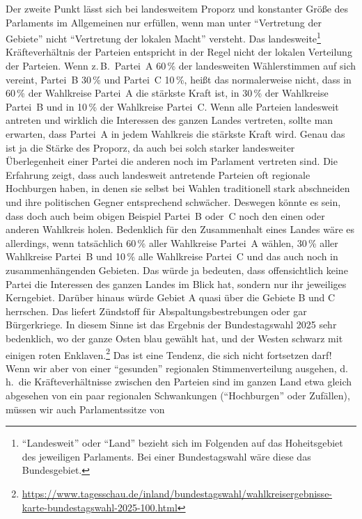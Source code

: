 Der zweite Punkt lässt sich bei landesweitem Proporz und konstanter Größe des Parlaments im
Allgemeinen nur erfüllen, wenn man unter \enquote{Vertretung der Gebiete} nicht
\enquote{Vertretung der lokalen Macht} versteht.
Das landesweite\footnote{\enquote{Landesweit} oder \enquote{Land} bezieht sich im Folgenden auf
das Hoheitsgebiet des jeweiligen Parlaments. Bei einer Bundestagswahl wäre diese das
Bundesgebiet.} Kräfteverhältnis der Parteien entspricht in der Regel nicht der lokalen Verteilung
der Parteien. Wenn z.\,B.\ Partei~A 60\,\% der landesweiten Wählerstimmen auf sich vereint,
Partei~B 30\,\% und Partei~C 10\,\%, heißt das normalerweise nicht, dass in 60\,\% der Wahlkreise
Partei~A die stärkste Kraft ist, in 30\,\% der Wahlkreise Partei~B und in 10\,\% der Wahlkreise
Partei~C. Wenn alle Parteien landesweit antreten und wirklich die Interessen des ganzen Landes
vertreten, sollte man erwarten, dass Partei~A in jedem Wahlkreis die stärkste Kraft wird. Genau
das ist ja die Stärke des Proporz, da auch bei solch starker landesweiter Überlegenheit einer
Partei die anderen noch im Parlament vertreten sind. Die Erfahrung zeigt, dass auch landesweit
antretende Parteien oft regionale Hochburgen haben, in denen sie selbst bei Wahlen traditionell
stark abschneiden und ihre politischen Gegner entsprechend schwächer. Deswegen könnte es sein,
dass doch auch beim obigen Beispiel Partei~B oder~C noch den einen oder anderen Wahlkreis holen.
Bedenklich für den Zusammenhalt eines Landes wäre es allerdings, wenn tatsächlich 60\,\% aller
Wahlkreise Partei~A wählen, 30\,\% aller Wahlkreise Partei~B und 10\,\% alle Wahlkreise Partei~C
und das auch noch in zusammenhängenden Gebieten. Das würde ja bedeuten, dass offensichtlich keine
Partei die Interessen des ganzen Landes im Blick hat, sondern nur ihr jeweiliges Kerngebiet.
Darüber hinaus würde Gebiet A quasi über die Gebiete B und C herrschen. Das liefert Zündstoff für
Abspaltungsbestrebungen oder gar Bürgerkriege.
In diesem Sinne ist das Ergebnis der Bundestagswahl 2025 sehr bedenklich, wo der ganze Osten blau
gewählt hat, und der Westen schwarz mit einigen roten Enklaven.\footnote{\url{https://www.tagesschau.de/inland/bundestagswahl/wahlkreisergebnisse-karte-bundestagswahl-2025-100.html}} Das ist eine
Tendenz, die sich nicht fortsetzen darf!
Wenn wir aber von einer \enquote{gesunden} regionalen Stimmenverteilung ausgehen, d.\,h.\ die
Kräfteverhältnisse zwischen den Parteien sind im ganzen Land etwa gleich abgesehen von ein paar
regionalen Schwankungen (\enquote{Hochburgen} oder Zufällen), müssen wir auch Parlamentssitze von
